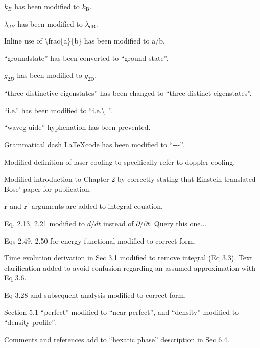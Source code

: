 \documentclass[paper=a4, fontsize=12pt]{scrartcl}
\begin{document}
\begin{description}[align=left]
    \item [Throughout] $k_B$ has been modified to $k_\textrm{B}$.
    \item [Throughout] $\lambda_{dB}$ has been modified to $\lambda_\textrm{dB}$.
    \item [Throughout] Inline use of
\textbackslash frac\{a\}\{b\} has been modified to a/b.
    \item [Throughout] ``groundstate'' has been converted to ``ground state''.
    \item [Throughout] $g_{2D}$ has been modified to $g_\textrm{2D}$.
    \item [P45] ``three distinctive eigenstates'' has been changed to ``three distinct eigenstates''.
    \item [Throughout] ``i.e.'' has been modified to ``i.e.\textbackslash \ ''.
    \item [P49] ``waveg-uide'' hyphenation has been prevented.
    \item [P81] Grammatical dash \LaTeX  code has been modified to ``-{}-{}-''.
    \item [P6] Modified definition of laser cooling to specifically refer to doppler cooling.
    \item [P7] Modified introduction to Chapter 2 by correctly stating that Einstein translated Bose' paper for publication.
    \item [P10] $\mathbf{r}$ and $\mathbf{r}^{\prime}$ arguments are added to integral equation.
    \item [P11,12] Eq. 2.13, 2.21 modified to $d/dt$ instead of $\partial / \partial t$. Query this one...
    \item [P21] Eqs 2.49, 2.50 for energy functional modified to correct form.
    \item [P28] Time evolution derivation in Sec 3.1 modified to remove integral (Eq 3.3). Text clarification added to avoid confusion regarding an assumed approximation with Eq 3.6.
    \item [P59] Eq 3.28 and subsequent analysis modified to correct form.
    \item [P89] Section 5.1 ``perfect'' modified to ``near perfect'', and ``density'' modified to ``density profile''.
    \item [P129] Comments and references add to ``hexatic phase'' description in Sec 6.4.
\end{description}
\end{document}

